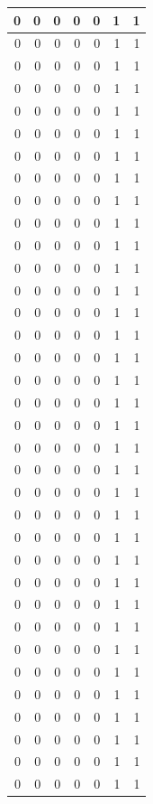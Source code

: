 \documentclass[
  12pt,
]{krantz}
\begin{document}
\begin{tabular}{r|r|r|r|r|r|r}
\hline
0 & 0 & 0 & 0 & 0 & 1 & 1\\
\hline
0 & 0 & 0 & 0 & 0 & 1 & 1\\
\hline
0 & 0 & 0 & 0 & 0 & 1 & 1\\
\hline
0 & 0 & 0 & 0 & 0 & 1 & 1\\
\hline
0 & 0 & 0 & 0 & 0 & 1 & 1\\
\hline
0 & 0 & 0 & 0 & 0 & 1 & 1\\
\hline
0 & 0 & 0 & 0 & 0 & 1 & 1\\
\hline
0 & 0 & 0 & 0 & 0 & 1 & 1\\
\hline
0 & 0 & 0 & 0 & 0 & 1 & 1\\
\hline
0 & 0 & 0 & 0 & 0 & 1 & 1\\
\hline
0 & 0 & 0 & 0 & 0 & 1 & 1\\
\hline
0 & 0 & 0 & 0 & 0 & 1 & 1\\
\hline
0 & 0 & 0 & 0 & 0 & 1 & 1\\
\hline
0 & 0 & 0 & 0 & 0 & 1 & 1\\
\hline
0 & 0 & 0 & 0 & 0 & 1 & 1\\
\hline
0 & 0 & 0 & 0 & 0 & 1 & 1\\
\hline
0 & 0 & 0 & 0 & 0 & 1 & 1\\
\hline
0 & 0 & 0 & 0 & 0 & 1 & 1\\
\hline
0 & 0 & 0 & 0 & 0 & 1 & 1\\
\hline
0 & 0 & 0 & 0 & 0 & 1 & 1\\
\hline
0 & 0 & 0 & 0 & 0 & 1 & 1\\
\hline
0 & 0 & 0 & 0 & 0 & 1 & 1\\
\hline
0 & 0 & 0 & 0 & 0 & 1 & 1\\
\hline
0 & 0 & 0 & 0 & 0 & 1 & 1\\
\hline
0 & 0 & 0 & 0 & 0 & 1 & 1\\
\hline
0 & 0 & 0 & 0 & 0 & 1 & 1\\
\hline
0 & 0 & 0 & 0 & 0 & 1 & 1\\
\hline
0 & 0 & 0 & 0 & 0 & 1 & 1\\
\hline
0 & 0 & 0 & 0 & 0 & 1 & 1\\
\hline
0 & 0 & 0 & 0 & 0 & 1 & 1\\
\hline
0 & 0 & 0 & 0 & 0 & 1 & 1\\
\hline
0 & 0 & 0 & 0 & 0 & 1 & 1\\
\hline
0 & 0 & 0 & 0 & 0 & 1 & 1\\
\hline
0 & 0 & 0 & 0 & 0 & 1 & 1\\
\hline
0 & 0 & 0 & 0 & 0 & 1 & 1\\

\end{tabular}
\end{document}

